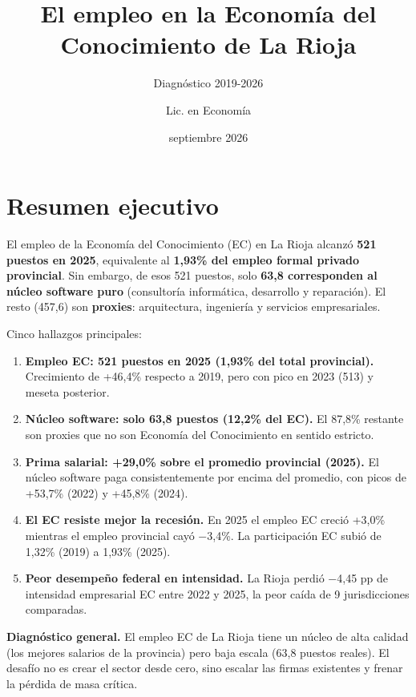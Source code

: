 \documentclass[
  spanish,
  letterpaper,
  DIV=11,
  numbers=noendperiod]{scrartcl}
\title{El empleo en la Economía del Conocimiento de La Rioja}
\subtitle{Diagnóstico 2019-2026}
\author{Lic. en Economía}
\date{septiembre 2026}
\renewcommand*\contentsname{Tabla de contenidos}
\newcommand\contentsname{Tabla de contenidos}
\begin{document}
\maketitle

\renewcommand*\contentsname{Tabla de contenidos}
{
\setcounter{tocdepth}{2}
\tableofcontents
}

\section{Resumen ejecutivo}\label{sec-resumen}

El empleo de la Economía del Conocimiento (EC) en La Rioja alcanzó
\textbf{521 puestos en 2025}, equivalente al \textbf{1,93\% del empleo
formal privado provincial}. Sin embargo, de esos 521 puestos, solo
\textbf{63,8 corresponden al núcleo software puro} (consultoría
informática, desarrollo y reparación). El resto (457,6) son
\textbf{proxies}: arquitectura, ingeniería y servicios empresariales.

Cinco hallazgos principales:

\begin{enumerate}
\def\labelenumi{\arabic{enumi}.}
\item
  \textbf{Empleo EC: 521 puestos en 2025 (1,93\% del total provincial).}
  Crecimiento de +46,4\% respecto a 2019, pero con pico en 2023 (513) y
  meseta posterior.
\item
  \textbf{Núcleo software: solo 63,8 puestos (12,2\% del EC).} El 87,8\%
  restante son proxies que no son Economía del Conocimiento en sentido
  estricto.
\item
  \textbf{Prima salarial: +29,0\% sobre el promedio provincial (2025).}
  El núcleo software paga consistentemente por encima del promedio, con
  picos de +53,7\% (2022) y +45,8\% (2024).
\item
  \textbf{El EC resiste mejor la recesión.} En 2025 el empleo EC creció
  +3,0\% mientras el empleo provincial cayó −3,4\%. La participación EC
  subió de 1,32\% (2019) a 1,93\% (2025).
\item
  \textbf{Peor desempeño federal en intensidad.} La Rioja perdió −4,45
  pp de intensidad empresarial EC entre 2022 y 2025, la peor caída de 9
  jurisdicciones comparadas.
\end{enumerate}

\textbf{Diagnóstico general.} El empleo EC de La Rioja tiene un núcleo
de alta calidad (los mejores salarios de la provincia) pero baja escala
(63,8 puestos reales). El desafío no es crear el sector desde cero, sino
escalar las firmas existentes y frenar la pérdida de masa crítica.
\end{document}
